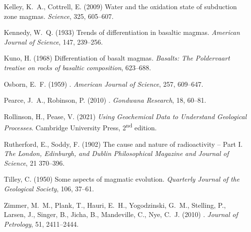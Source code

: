 \documentclass{article}
\begin{document}
\begin{thebibliography}{15}
Kelley, K.~A., Cottrell, E. (2009)
\newblock Water and the oxidation state of subduction zone magmas.
\newblock \emph{Science}, 325, 605--607.

Kennedy, W.~Q. (1933)
\newblock Trends of differentiation in basaltic magmas.
\newblock \emph{American Journal of Science}, 147, 239--256.

Kuno, H. (1968) 
\newblock Differentiation of basalt magmas.
\newblock \emph{Basalts: The Poldervaart treatise on rocks of basaltic
  composition}, 623--688.

Osborn, E.~F. (1959)
.
\newblock \emph{American Journal of Science}, 257, 609--647.

Pearce, J.~A., Robinson, P. (2010)
.
\newblock \emph{Gondwana Research}, 18, 60--81.

Rollinson, H., Pease, V. (2021)
\newblock \emph{{Using Geochemical Data to Understand Geological Processes}}.
\newblock Cambridge University Press, 2\textsuperscript{nd} edition.

Rutherford, E., Soddy, F. (1902)
\newblock The cause and nature of radioactivity -- Part I.
\newblock \emph{The London, Edinburgh, and Dublin Philosophical Magazine and
  Journal of Science}, 21 370--396.

Tilley, C. (1950) 
\newblock Some aspects of magmatic evolution.
\newblock \emph{Quarterly Journal of the Geological Society}, 106, 37--61.

Zimmer, M.~M., Plank, T., Hauri, E.~H., Yogodzinski, G.~M., Stelling, P.,
  Larsen, J., Singer, B., Jicha, B., Mandeville, C., Nye, C.~J. (2010) 
.
\newblock \emph{Journal of Petrology}, 51, 2411--2444.

\end{thebibliography}
\end{document}
